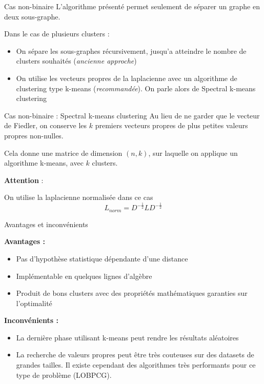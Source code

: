 \begin{frame}{Cas non-binaire}
    L'algorithme présenté permet seulement de séparer un graphe en deux sous-graphe.

    Dans le cas de plusieurs clusters :
    \begin{itemize}
        \item On sépare les sous-graphes récursivement, jusqu'a atteindre le nombre de clusters souhaités (\textit{ancienne approche})
        \item On utilise les vecteurs propres de la laplacienne avec un algorithme de clustering type k-means (\textit{recommandée}). On parle alors de \alert{Spectral k-means clustering}
    \end{itemize}
\end{frame}

\begin{frame}{Cas non-binaire : Spectral k-means clustering}
    Au lieu de ne garder que le vecteur de Fiedler, on conserve les $k$ premiers vecteurs propres de plus petites valeurs propres non-nulles.

    Cela donne une matrice de dimension $(n,k)$, sur laquelle on applique un algorithme k-means, avec $k$ clusters.

    \alert{\textbf{Attention}} : 
    
    On utilise la laplacienne normalisée dans ce cas 
    $$L_{norm} = D^{-\frac{1}{2}}LD^{-\frac{1}{2}}$$
\end{frame}

\begin{frame}{Avantages et inconvénients}
    \begin{minipage}[t]{0.49\linewidth}
        \textbf{Avantages : }
        \begin{itemize}
            \item Pas d'hypothèse statistique dépendante d'une distance
            \item Implémentable en quelques lignes d'algèbre
            \item Produit de bons clusters avec des propriétés mathématiques garanties sur l'optimalité
        \end{itemize}
    \end{minipage}
    \begin{minipage}[t]{0.49\linewidth}
        \textbf{Inconvénients : }
        \begin{itemize}
            \item La dernière phase utilisant k-means peut rendre les résultats aléatoires
            \item La recherche de valeurs propres peut être très couteuses sur des datasets de grandes tailles. Il existe cependant des algorithmes très performants pour ce type de problème (LOBPCG).
        \end{itemize}
    \end{minipage}
\end{frame}

